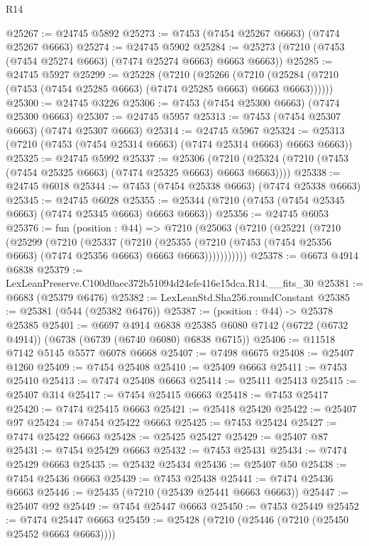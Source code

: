 \begin{lexlean}{R14}
\begin{coremodule}
@25267 := @24745 @5892
@25273 := @7453 (@7454 @25267 @6663) (@7474 @25267 @6663)
@25274 := @24745 @5902
@25284 := @25273 (@7210 (@7453 (@7454 @25274 @6663) (@7474 @25274 @6663) @6663 @6663))
@25285 := @24745 @5927
@25299 := @25228
    (@7210
      (@25266
        (@7210 (@25284 (@7210 (@7453 (@7454 @25285 @6663) (@7474 @25285 @6663) @6663 @6663))))))
@25300 := @24745 @3226
@25306 := @7453 (@7454 @25300 @6663) (@7474 @25300 @6663)
@25307 := @24745 @5957
@25313 := @7453 (@7454 @25307 @6663) (@7474 @25307 @6663)
@25314 := @24745 @5967
@25324 := @25313 (@7210 (@7453 (@7454 @25314 @6663) (@7474 @25314 @6663) @6663 @6663))
@25325 := @24745 @5992
@25337 := @25306
    (@7210 (@25324 (@7210 (@7453 (@7454 @25325 @6663) (@7474 @25325 @6663) @6663 @6663))))
@25338 := @24745 @6018
@25344 := @7453 (@7454 @25338 @6663) (@7474 @25338 @6663)
@25345 := @24745 @6028
@25355 := @25344 (@7210 (@7453 (@7454 @25345 @6663) (@7474 @25345 @6663) @6663 @6663))
@25356 := @24745 @6053
@25376 := fun (position : @44) =>
  @7210
    (@25063
      (@7210
        (@25221
          (@7210
            (@25299
              (@7210
                (@25337
                  (@7210
                    (@25355
                      (@7210 (@7453 (@7454 @25356 @6663) (@7474 @25356 @6663) @6663 @6663)))))))))))
@25378 := @6673 @4914 @6838
@25379 := LexLeanPreserve.C100d0aec372b51094d24efe416e15dca.R14.__fits_30
@25381 := @6683 (@25379 @6476)
@25382 := LexLeanStd.Sha256.roundConstant
@25385 := @25381 (@544 (@25382 @6476))
@25387 := (position : @44) -> @25378 @25385
@25401 := @6697
    @4914
    @6838
    @25385
    @6080
    @7142
    (@6722 (@6732 @4914))
    (@6738 (@6739 (@6740 @6080) @6838 @6715))
@25406 := @11518 @7142 @5145 @5577 @6078 @6668
@25407 := @7498 @6675
@25408 := @25407 @1260
@25409 := @7454 @25408
@25410 := @25409 @6663
@25411 := @7453 @25410
@25413 := @7474 @25408 @6663
@25414 := @25411 @25413
@25415 := @25407 @314
@25417 := @7454 @25415 @6663
@25418 := @7453 @25417
@25420 := @7474 @25415 @6663
@25421 := @25418 @25420
@25422 := @25407 @97
@25424 := @7454 @25422 @6663
@25425 := @7453 @25424
@25427 := @7474 @25422 @6663
@25428 := @25425 @25427
@25429 := @25407 @87
@25431 := @7454 @25429 @6663
@25432 := @7453 @25431
@25434 := @7474 @25429 @6663
@25435 := @25432 @25434
@25436 := @25407 @50
@25438 := @7454 @25436 @6663
@25439 := @7453 @25438
@25441 := @7474 @25436 @6663
@25446 := @25435 (@7210 (@25439 @25441 @6663 @6663))
@25447 := @25407 @92
@25449 := @7454 @25447 @6663
@25450 := @7453 @25449
@25452 := @7474 @25447 @6663
@25459 := @25428 (@7210 (@25446 (@7210 (@25450 @25452 @6663 @6663))))

\end{coremodule}
\end{lexlean}

